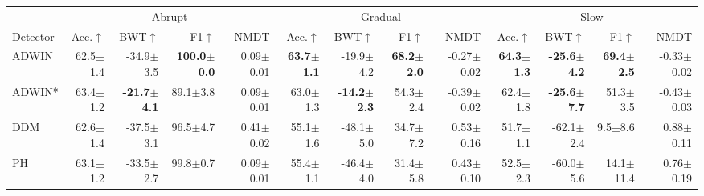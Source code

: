 \begin{tabular}{lr@{\hspace{\dimexpr2\tabcolsep+4pt\relax}}r@{\hspace{\dimexpr2\tabcolsep+4pt\relax}}rrr@{\hspace{\dimexpr2\tabcolsep+4pt\relax}}r@{\hspace{\dimexpr2\tabcolsep+4pt\relax}}rrr@{\hspace{\dimexpr2\tabcolsep+4pt\relax}}r@{\hspace{\dimexpr2\tabcolsep+4pt\relax}}rr}
\toprule
 & \multicolumn{4}{c}{Abrupt} & \multicolumn{4}{c}{Gradual} & \multicolumn{4}{c}{Slow} \\
\cmidrule(lr){2-5}\cmidrule(lr){6-9}\cmidrule(lr){10-13}
Detector & Acc.$\uparrow$ & BWT$\uparrow$ & F1$\uparrow$ & NMDT & Acc.$\uparrow$ & BWT$\uparrow$ & F1$\uparrow$ & NMDT & Acc.$\uparrow$ & BWT$\uparrow$ & F1$\uparrow$ & NMDT \\
\midrule
ADWIN & 62.5{\tiny\phantom{0}$\pm$1.4} & -34.9{\tiny\phantom{0}$\pm$3.5} & \textbf{100.0{\tiny\phantom{0}$\pm$0.0}} & 0.09{\tiny\phantom{0}$\pm$0.01} & \textbf{63.7{\tiny\phantom{0}$\pm$1.1}} & -19.9{\tiny\phantom{0}$\pm$4.2}\rlap{$^{\downarrow}$} & \textbf{68.2{\tiny\phantom{0}$\pm$2.0}} & -0.27{\tiny\phantom{0}$\pm$0.02} & \textbf{64.3{\tiny\phantom{0}$\pm$1.3}} & \textbf{-25.6{\tiny\phantom{0}$\pm$4.2}} & \textbf{69.4{\tiny\phantom{0}$\pm$2.5}} & -0.33{\tiny\phantom{0}$\pm$0.02} \\
ADWIN* & 63.4{\tiny\phantom{0}$\pm$1.2} & \textbf{-21.7{\tiny\phantom{0}$\pm$4.1}}\rlap{$^{\uparrow}$} & 89.1{\tiny\phantom{0}$\pm$3.8} & 0.09{\tiny\phantom{0}$\pm$0.01} & 63.0{\tiny\phantom{0}$\pm$1.3} & \textbf{-14.2{\tiny\phantom{0}$\pm$2.3}} & 54.3{\tiny\phantom{0}$\pm$2.4} & -0.39{\tiny\phantom{0}$\pm$0.02} & 62.4{\tiny\phantom{0}$\pm$1.8} & \textbf{-25.6{\tiny\phantom{0}$\pm$7.7}} & 51.3{\tiny\phantom{0}$\pm$3.5} & -0.43{\tiny\phantom{0}$\pm$0.03} \\
DDM & 62.6{\tiny\phantom{0}$\pm$1.4} & -37.5{\tiny\phantom{0}$\pm$3.1} & 96.5{\tiny\phantom{0}$\pm$4.7} & 0.41{\tiny\phantom{0}$\pm$0.02} & 55.1{\tiny\phantom{0}$\pm$1.6}\rlap{$^{\downarrow}$} & -48.1{\tiny\phantom{0}$\pm$5.0}\rlap{$^{\downarrow\dagger}$} & 34.7{\tiny\phantom{0}$\pm$7.2} & 0.53{\tiny\phantom{0}$\pm$0.16} & 51.7{\tiny\phantom{0}$\pm$1.1}\rlap{$^{\downarrow\ddagger}$} & -62.1{\tiny\phantom{0}$\pm$2.4}\rlap{$^{\downarrow\ddagger}$} & 9.5{\tiny\phantom{0}$\pm$8.6} & 0.88{\tiny\phantom{0}$\pm$0.11} \\
PH & 63.1{\tiny\phantom{0}$\pm$1.2} & -33.5{\tiny\phantom{0}$\pm$2.7} & 99.8{\tiny\phantom{0}$\pm$0.7} & 0.09{\tiny\phantom{0}$\pm$0.01} & 55.4{\tiny\phantom{0}$\pm$1.1}\rlap{$^{\downarrow}$} & -46.4{\tiny\phantom{0}$\pm$4.0}\rlap{$^{\downarrow\dagger}$} & 31.4{\tiny\phantom{0}$\pm$5.8} & 0.43{\tiny\phantom{0}$\pm$0.10} & 52.5{\tiny\phantom{0}$\pm$2.3}\rlap{$^{\downarrow\ddagger}$} & -60.0{\tiny\phantom{0}$\pm$5.6}\rlap{$^{\downarrow\ddagger}$} & 14.1{\tiny$\pm$11.4} & 0.76{\tiny\phantom{0}$\pm$0.19} \\

\end{tabular}
